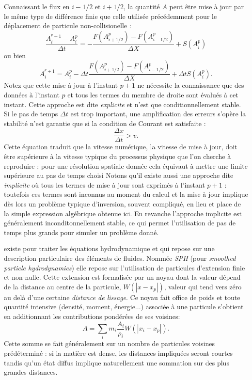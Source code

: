  Connaissant le flux en $i-1/2$ et $i+1/2$, la quantité $A$ peut être mise à jour par le même type de différence finie que celle utilisée précédemment pour le déplacement de particule non-collisionelle :
 \begin{equation}
 \frac{A_i^{^p+1}-A_i^p}{\Delta t}=-\frac{F(A_{i+1/2}^p)-F(A_{i-1/2}^p)}{\Delta X}+S(A_i^p)
 \end{equation}
 ou bien
 \begin{equation}
 A_i^{^p+1}=A_i^p-\Delta t \frac{F(A_{i+1/2}^p)-F(A_{i-1/2}^p)}{\Delta X}+\Delta t S(A_i^p).
 \end{equation}
Notez que cette mise à jour à l'instant $p+1$ ne nécessite la connaissance que des données à l'instant $p$ et tous les termes du membre de droite sont évalués à cet instant. Cette approche est dite \textit{explicite} et n'est que conditionnellement stable. Si le pas de temps $\Delta t$ est trop important, une amplification des erreurs s'opère la stabilité n'est garantie que si la condition de Courant est satisfaite :
\begin{equation}
\frac{\Delta x}{ \Delta t}> v.
\end{equation}
Cette équation traduit que la vitesse numérique, la vitesse de mise à jour, doit être supérieure à la vitesse typique du processus physique que l'on cherche à reproduire : pour une résolution spatiale donnée cela équivaut à mettre une limite supérieure au pas de temps choisi  Notons qu'il existe aussi une approche dite \textit{implicite} où tous les termes de mise à jour sont exprimés à l'instant $p+1$ : toutefois ces termes sont inconnus au moment du calcul et la mise à jour implique dès lors un problème typique d'inversion, souvent compliqué, en lieu et place de la simple expression algébrique obtenue ici. En revanche l'approche implicite est généralement inconditonnellement stable, ce qui permet l'utilisation de pas de temps plus grands pour simuler un problème donné.

 existe pour traiter les équations hydrodynamique et qui repose sur une description particulaire des éléments de fluides. Nommée \textit{SPH} (pour \textit{smoothed particle hydrodynamics}) elle repose sur l'utilisation de particules d'extension finie et non-nulle. Cette extension est formalisée par un noyau dont la valeur dépend de la distance au centre de la particule, $W(|x-x_p|)$, valeur qui tend vers zéro au delà d'une certaine \textit{distance de lissage}. Ce noyau fait office de poids et toute quantité intensive (densité, moment, énergie...) associée à une particule s'obtient en additionnant les contributions pondérées de ses voisines:
\begin{equation}
A=\sum_i m_i \frac{A_i}{\rho_i} W(|x_i-x_p|).
\end{equation} 
Cette somme se fait généralement sur un nombre de particules voisines prédéterminé : si la matière est dense, les distances impliquées seront courtes tandis qu'un état diffus implique naturellement une sommation sur des plus grandes distances.
 
